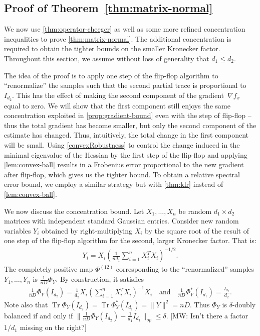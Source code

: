 \documentclass[aos]{imsart}
\theoremstyle{definition}
\numberwithin{equation}{section}
\DeclareMathOperator{\tr}{Tr}
\newcommand{\samp}{x}
\newcommand{\MW}[1]{{\color{red}[MW: #1]}}
\begin{document}
\subsection{Proof of Theorem~\ref{thm:matrix-normal}}
We now use \cref{thm:operator-cheeger} as well as some more refined concentration inequalities to prove \cref{thm:matrix-normal}.
The additional concentration is required to obtain the tighter bounds on the smaller Kronecker factor.
Throughout this section, we assume without loss of generality that $d_1 \leq d_2$.

The idea of the proof is to apply one step of the flip-flop algorithm to ``renormalize'' the samples such that the second partial trace is proportional to $I_{d_2}$.
This has the effect of making the second component of the gradient~$\nabla f_\samp$ equal to zero.
We will show that the first component still enjoys the same concentration exploited in \cref{prop:gradient-bound} even with the step of flip-flop -- thus the total gradient has become smaller, but only the second component of the estimate has changed.
Thus, intuitively, the total change in the first component will be small.
Using \cref{convexRobustness} to control the change induced in the minimal eigenvalue of the Hessian by the first step of the flip-flop and applying \cref{lem:convex-ball} results in a Frobenius error proportional to the new gradient after flip-flop, which gives us the tighter bound.
To obtain a relative spectral error bound, we employ a similar strategy but with \cref{thm:klr} instead of \cref{lem:convex-ball}.

We now discuss the concentration bound.
Let $X_1,\dots,X_n$ be random $d_1 \times d_2$ matrices with independent standard Gaussian entries.
Consider new random variables $Y_i$ obtained by right-multiplying $X_i$ by the square root of the result of one step of the flip-flop algorithm for the second, larger Kronecker factor.
That is:
\begin{align*}
  Y_i = X_i \left( \frac1{nd_1} \sum_{i=1}^n X_i^T X_i \right)^{-1/2}.
\end{align*}
The completely positive map $\Phi^{(12)}$ corresponding to the ``renormalized'' samples $Y_1,\dots,Y_n$ is $\frac1{nD} \Phi_Y$.
By construction, it satisfies
\begin{align}\label{eq:one-step}
  \frac1{n D} \Phi_Y(I_{d_2}) = \frac1{d_2} X_i \left( \sum_{i=1}^n X_i^T X_i \right)^{-1} X_i
\quad\text{and}\quad
  \frac1{n D} \Phi^*_Y(I_{d_1}) = \frac{I_{d_2}}{d_2}.
\end{align}
Note also that $\tr \Phi_Y(I_{d_2}) = \tr \Phi_Y^*(I_{d_1}) = \|Y\|^2 = nD$. Thus $\Phi_Y$ is $\delta$-doubly balanced if and only if $\|\frac{1}{nD} \Phi_Y(I_{d_2}) - \frac{1}{d_1} I_{d_1}\|_{op} \leq \delta$.
\MW{Isn't there a factor $1/d_1$ missing on the right?}
\end{document}
